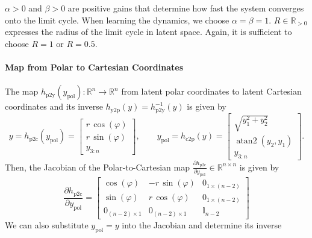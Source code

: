 $\alpha > 0$ and $\beta > 0$ are positive gains that determine how fast the system converges onto the limit cycle.  When learning the dynamics, we choose $\alpha = \beta = 1$. $R \in \mathbb{R}_{>0}$ expresses the radius of the limit cycle in latent space. Again, it is sufficient to choose $R =1$ or $R=0.5$.

\paragraph{Map from Polar to Cartesian Coordinates}
The map $h_{\mathrm{p2y}}(y_\mathrm{pol}): \mathbb{R}^n \to \mathbb{R}^n$ from latent polar coordinates to latent Cartesian coordinates and its inverse $h_{\mathrm{y2p}}(y) = h_{\mathrm{p2y}}^{-1}(y)$ is given by
\begin{equation}
    y = h_{\mathrm{p2c}}(y_\mathrm{pol}) = \begin{bmatrix}
        r \, \cos(\varphi)\\
        r \, \sin(\varphi)\\
        y_{3:n}
    \end{bmatrix},
    \qquad
    y_\mathrm{pol} = h_{\mathrm{c2p}}(y) = \begin{bmatrix}
        \sqrt{y_1^2+y_2^2}\\
        \operatorname{atan2}(y_2, y_1)\\
        y_{3:n}
    \end{bmatrix}.
\end{equation}
Then, the Jacobian of the Polar-to-Cartesian map $\frac{\partial h_{\mathrm{p2c}}}{\partial y_\mathrm{pol}} \in \mathbb{R}^{n \times n}$ is given by
\begin{equation}
    \frac{\partial h_{\mathrm{p2c}}}{\partial y_\mathrm{pol}} = \begin{bmatrix}
        \cos(\varphi) & -r \, \sin(\varphi) & 0_{1 \times (n-2)}\\
        \sin(\varphi) & r \, \cos(\varphi) & 0_{1 \times (n-2)}\\
        0_{(n-2) \times 1} & 0_{(n-2) \times 1} & \mathbb{I}_{n-2}
    \end{bmatrix}
\end{equation}
We can also substitute $y_\mathrm{pol} = y$ into the Jacobian and determine its inverse
